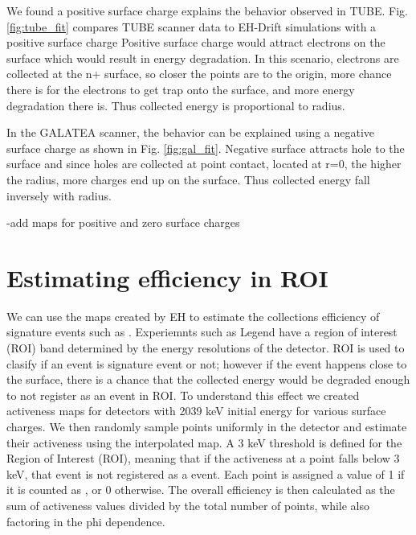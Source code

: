 We found a positive surface charge explains the behavior observed in TUBE. Fig. \ref{fig:tube_fit} compares TUBE scanner data to EH-Drift simulations with a positive surface charge Positive surface charge would attract electrons on the surface which would result in energy degradation. In this scenario, electrons are collected at the n+ surface, so closer the points are to the origin, more chance there is for the electrons to get trap onto the surface, and more energy degradation there is. Thus collected energy is proportional to radius.



In the GALATEA scanner, the behavior can be explained using a negative surface charge as shown in Fig. \ref{fig:gal_fit}. Negative surface attracts hole to the surface and since holes are collected at point contact, located at r=0, the higher the radius, more charges end up on the surface. Thus collected energy fall inversely with radius.

-add maps for positive and zero surface charges



\section{\label{res:2} Estimating efficiency in ROI}


We can use the maps created by EH to estimate the collections efficiency of signature events such as {\onbb}. Experiemnts such as Legend have a region of interest (ROI) band determined by the energy resolutions of the detector. ROI is used to clasify if an event is signature event or not; however if the event happens close to the surface, there is a chance that the collected energy would be degraded enough to not register as an event in ROI. To understand this effect we created activeness maps for detectors with 2039 keV initial energy for various surface charges. We then randomly sample points uniformly in the detector and estimate their activeness using the interpolated map. A 3 keV threshold is defined for the Region of Interest (ROI), meaning that if the activeness at a point falls below 3 keV, that event is not registered as a {\onbb} event. Each point is assigned a value of 1 if it is counted as {\onbb}, or 0 otherwise. The overall efficiency is then calculated as the sum of activeness values divided by the total number of points, while also factoring in the phi dependence.

